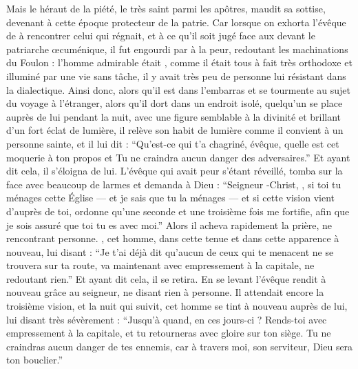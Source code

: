 Mais le héraut de la piété,   le très saint parmi les apôtres, maudit sa sottise,  devenant à cette époque protecteur de la patrie.
Car lorsque on exhorta  l'évêque de  à rencontrer celui qui régnait, et à ce qu'il soit jugé face aux  devant le patriarche œcuménique, il fut engourdi par  à la peur, redoutant les machinations du Foulon : 
l'homme admirable était , comme il était tous à fait très orthodoxe et illuminé par  une vie sans tâche, il y avait très peu de personne lui résistant dans la dialectique.
Ainsi donc, alors qu'il est dans l'embarras et se tourmente au sujet du voyage à l'étranger,
alors qu'il dort dans un endroit isolé, 
quelqu'un se place auprès de lui pendant la nuit,
avec une figure semblable à la divinité et brillant d'un fort éclat de lumière, 
il relève son habit de lumière comme il convient à un personne sainte, 
et il lui dit 
 : %
\enquote{Qu'est-ce qui t'a chagriné, évêque, quelle est cet moquerie à ton propos et 
Tu ne craindra aucun danger des adversaires.}
Et ayant dit cela, il s'éloigna de lui.
L'évêque qui avait peur s'étant réveillé, tomba sur la face avec beaucoup de larmes et demanda à Dieu : 
\enquote{Seigneur -Christ, ,
si toi tu ménages cette Église --- et je sais que tu la ménages ---
et si cette vision vient d'auprès de toi, ordonne qu'une seconde et une troisième fois  me fortifie, afin que je sois assuré que toi tu es avec moi.}
Alors il acheva rapidement la prière, ne rencontrant personne.
, cet homme, dans cette tenue et dans cette apparence  à nouveau, lui disant :
\enquote{Je t'ai déjà dit qu'aucun de ceux qui te menacent ne se trouvera sur ta route, 
va maintenant avec empressement à la capitale, ne redoutant rien.}
Et ayant dit cela, il se retira.
En se levant l'évêque rendit à nouveau grâce au seigneur, ne disant rien à personne.
Il attendait encore la troisième vision, et la nuit qui suivit, cet homme se tint à nouveau auprès de lui, lui disant très sévèrement :
\enquote{Jusqu'à quand,  en ces jours-ci ? Rends-toi avec empressement à la capitale, et tu retourneras avec gloire sur ton siège. 
Tu ne craindras aucun danger de tes ennemis, car à travers moi, son serviteur, Dieu sera ton bouclier.}
